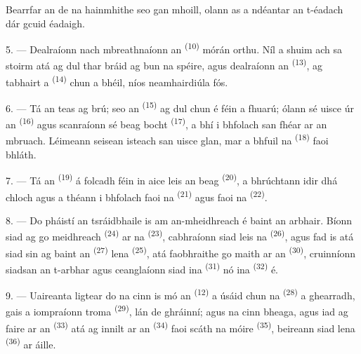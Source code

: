 Bearrfar an  de na hainmhithe seo gan mhoill, olann as a ndéantar an
t-éadach dár gcuid éadaigh.

\VUsaut{5.0mm}
\VUsaut{3.4mm}

5. --- Dealraíonn nach mbreathnaíonn an  \textsuperscript{(10)}
mórán orthu. Níl a shuim ach sa stoirm atá ag dul thar bráid ag bun na spéire, agus
dealraíonn an  \textsuperscript{(13)}, ag tabhairt a
 \textsuperscript{(14)} chun a bhéil, níos neamhairdiúla fós.

6. --- Tá an teas ag brú; seo an  \textsuperscript{(15)} ag dul chun
é féin a fhuarú; ólann sé uisce úr an  \textsuperscript{(16)} agus
scanraíonn sé  beag bocht \textsuperscript{(17)}, a bhí i bhfolach san
fhéar ar an mbruach. Léimeann seisean isteach san uisce glan, mar a bhfuil na
 \textsuperscript{(18)} faoi bhláth.

7. --- Tá an  \textsuperscript{(19)} á folcadh féin in aice leis an
 beag \textsuperscript{(20)}, a bhrúchtann idir dhá chloch agus a
théann i bhfolach faoi na  \textsuperscript{(21)} agus
faoi na  \textsuperscript{(22)}.

\VUsaut{5.0mm}
\VUsaut{3.4mm}

8. --- Do pháistí an tsráidbhaile is am an-mheidhreach é baint an arbhair. Bíonn
siad ag  go meidhreach \textsuperscript{(24)} ar na
 \textsuperscript{(23)}, cabhraíonn siad leis na
 \textsuperscript{(26)}, agus fad is atá siad sin ag baint an
 \textsuperscript{(27)} lena 
\textsuperscript{(25)}, atá faobhraithe go maith ar an 
\textsuperscript{(30)}, cruinníonn siadsan an t-arbhar agus ceanglaíonn siad ina
 \textsuperscript{(31)} nó ina 
\textsuperscript{(32)} é.

9. --- Uaireanta ligtear do na cinn is mó an 
\textsuperscript{(12)} a úsáid chun na 
\textsuperscript{(28)} a ghearradh, gais a iompraíonn  troma
\textsuperscript{(29)}, lán de ghráinní; agus na cinn bheaga, agus iad ag faire ar
an  \textsuperscript{(33)} atá ag innilt ar an
 \textsuperscript{(34)} faoi scáth na  móire
\textsuperscript{(35)}, beireann siad lena  \textsuperscript{(36)} ar
 áille.

